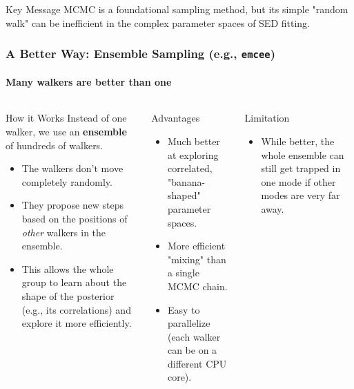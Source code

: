 \documentclass[aspectratio=169]{beamer}
\newcommand{\keyterm}[1]{\textbf{\textcolor{C0}{#1}}}
\begin{document}
\begin{frame}
    \begin{alertblock}{Key Message}
        MCMC is a foundational sampling method, but its simple "random walk" can be inefficient in the complex parameter spaces of SED fitting.
    \end{alertblock}
\end{frame}

\begin{frame}
    \frametitle{A Better Way: Ensemble Sampling (e.g., \texttt{emcee})}
    \framesubtitle{Many walkers are better than one}
    
    \begin{columns}[T]
        \begin{block}{How it Works}
            Instead of one walker, we use an \keyterm{ensemble} of hundreds of walkers.
            \begin{itemize}
                \item The walkers don't move completely randomly.
                \item They propose new steps based on the positions of \textit{other} walkers in the ensemble.
                \item This allows the whole group to learn about the shape of the posterior (e.g., its correlations) and explore it more efficiently.
            \end{itemize}
        \end{block}
        
        \begin{block}{Advantages}
            \begin{itemize}
                \item Much better at exploring correlated, "banana-shaped" parameter spaces.
                \item More efficient "mixing" than a single MCMC chain.
                \item Easy to parallelize (each walker can be on a different CPU core).
            \end{itemize}
        \end{block}
        
        \begin{block}{Limitation}
            \begin{itemize}
                \item While better, the whole ensemble can still get trapped in one mode if other modes are very far away.
            \end{itemize}
        \end{block}
        

\end{columns}
\end{frame}
\end{document}
